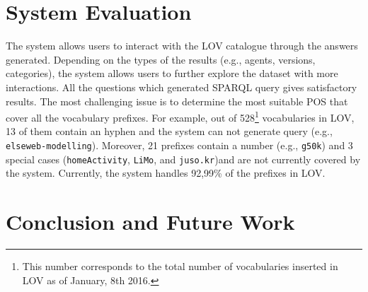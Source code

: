 \documentclass[runningheads,a4paper]{llncs}
\newcommand{\todo}[1]{\noindent\textcolor{red}{{\bf \{TODO}: #1{\bf \}}}}
\begin{document}
\section{System Evaluation}
\label{sec:evaluation}

The system allows users to interact with the LOV catalogue through the answers generated. Depending on the types of the results (e.g., agents, versions, categories), the system allows users to further explore the dataset with more interactions.
All the questions which generated SPARQL query gives satisfactory results. The most challenging issue is to determine the most suitable POS that cover all the vocabulary prefixes. For example, out of 528\footnote{This number corresponds to the total number of vocabularies inserted in LOV as of January, 8th 2016.} vocabularies in LOV, 13 of them contain an hyphen and the system can not generate query (e.g., \texttt{elseweb-modelling}). Moreover, 21 prefixes contain a number (e.g., \texttt{g50k}) and 3 special cases (\texttt{homeActivity}, \texttt{LiMo}, and \texttt{juso.kr})and are not currently covered by the system. Currently, the system handles 92,99\% of the prefixes in LOV.




\vspace{1mm}
\section{Conclusion and Future Work}
\label{sec:conclusion}
%
\end{document}
